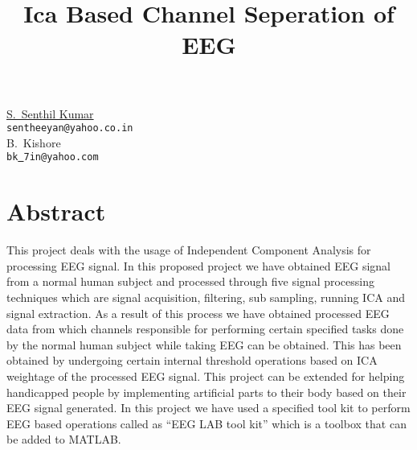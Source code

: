 \title{Ica Based Channel Seperation of EEG}
\author{} \institute{}
\maketitle

\begin{center}
{\large \underline{S.~Senthil Kumar}}\\
{\tt sentheeyan@yahoo.co.in}\\
\vspace{4mm}
{\large B.~Kishore}\\
{\tt bk\underline{ }7in@yahoo.com}
\end{center}

\section*{Abstract}
This project deals with the usage of Independent Component Analysis for processing EEG signal. In this proposed project we have obtained EEG signal from a normal human subject and processed through five signal processing techniques which are signal acquisition, filtering, sub sampling, running ICA and signal extraction. As a result of this process we have obtained processed EEG data from which channels responsible for performing certain specified tasks done by the normal human subject while taking EEG can be obtained. This has been obtained by undergoing certain internal threshold operations based on ICA weightage of the processed EEG signal. This project can be extended for helping handicapped people by implementing artificial parts to their body based on their EEG signal generated. In this project we have used a specified tool kit to perform EEG based operations called as “EEG LAB tool kit” which is a toolbox that can be added to MATLAB.